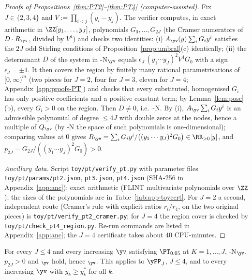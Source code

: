 \begin{proof}[Proofs of Propositions~\ref{thm:PT2}--\ref{thm:PT4} \textup{(computer-assisted)}]
Fix $J\in\{2,3,4\}$ and $V:=\prod_{i<j}(y_i-y_j)$. The verifier computes, in exact arithmetic in
$\ZZ[y_1,\dots,y_J]$, polynomials $G_0,\dots,G_{2J}$ (the Cramer numerators of $D\cdot R_{\yv}$, divided by $V^4$) and
checks two identities: (i) $A_{\yv}(y)\sum_iG_iy^i$ satisfies the $2J$ odd Stirling conditions of
Proposition~\ref{prop:umbral}(c) identically; (ii) the determinant $D$ of the system in \hyp{N}$_{\yv}$ equals
$\epsilon_J\,(y_1\cdots y_J)^2V^4G_0$ with a sign $\epsilon_J=\pm1$. It then covers the region by finitely many rational
parametrisations of $[0,\infty)^m$ (two pieces for $J=2$, four for $J=3$, eleven for $J=4$; Appendix~\ref{app:proofs-PT})
and checks that every substituted, homogenised $G_i$ has only positive coefficients and a positive constant term; by
Lemma~\ref{lem:posc}(b), every $G_i>0$ on the region. Then $D\neq0$, i.e.\ \hyp{N}. By (i), $A_{\yv}\sum_iG_iy^i$ is an
admissible polynomial of degree $\le4J$ with double zeros at the nodes, hence a multiple of $Q_{\yv}$ (by \hyp{N} the
space of such polynomials is one-dimensional); comparing values at $0$ gives
$R_{\yv}=\sum_iG_iy^i/\bigl((y_1\cdots y_J)^2G_0\bigr)\in\RR_{>0}[y]$, and $p_{2J}=G_{2J}/((y_1\cdots y_J)^2G_0)>0$.

\emph{Ancillary data.} Script \nolinkurl{toy/pt/verify_pt.py} with parameter files \nolinkurl{toy/pt/params/pt2.json},
\nolinkurl{pt3.json}, \nolinkurl{pt4.json} (SHA-256 in Appendix~\ref{app:anc}); exact arithmetic (FLINT multivariate
polynomials over $\ZZ$); the sizes of the polynomials are in Table~\ref{tab:app-toycert}. For $J=2$ a second, independent route (Cramer's rule with explicit
ratios $r_i/r_4$, on the two original pieces) is \nolinkurl{toy/pt/verify_pt2_cramer.py}; for $J=4$ the region cover is
checked by \nolinkurl{toy/pt/check_pt4_region.py}. Re-run commands are listed in Appendix~\ref{app:anc}; the $J=4$
certificate takes about $40$ CPU-minutes.
\end{proof}

\begin{corollary}\label{cor:PT-small}
For every $J\le4$ and every increasing $\yv$ satisfying $\PT_{0.05}$ at $K=1,\dots,J$, \hyp{N}$_{\yv}$, $p_{2J}>0$ and
\Rp$_{\yv}$ hold, hence \FRt$_{\yv}$. This applies to $\yPP_J$, $J\le4$, and to every increasing $\yv$ with
$y_k\ge y^*_k$ for all $k$.
\end{corollary}

